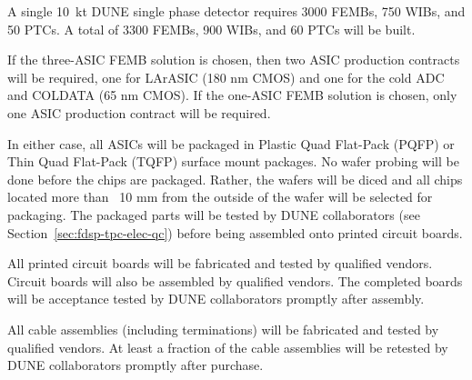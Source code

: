 A single 10~kt DUNE single phase detector requires 3000 FEMBs, 750 WIBs, and 50 PTCs.  A total of 3300 FEMBs, 900 WIBs, and 60 PTCs will be built.

If the three-ASIC FEMB solution is chosen, then two ASIC production contracts will be required, one for LArASIC (180 nm CMOS) and one for the cold ADC and COLDATA (65 nm CMOS).  If the one-ASIC FEMB solution is chosen, only one ASIC production contract will be required.

In either case, all ASICs will be packaged in Plastic Quad Flat-Pack (PQFP) or Thin Quad Flat-Pack (TQFP) surface mount packages.  No wafer probing will be done before the chips are packaged.  Rather, the wafers will be diced and all chips located more than ~10 mm from the outside of the wafer will be selected for packaging.  The packaged parts will be tested by DUNE collaborators (see Section~\ref{sec:fdsp-tpc-elec-qc}) before being assembled onto printed circuit boards.

All printed circuit boards will be fabricated and tested by qualified vendors. Circuit boards will also be assembled by qualified vendors.  The completed boards will be acceptance tested by DUNE collaborators promptly after assembly.

All cable assemblies (including terminations) will be fabricated and tested by qualified vendors. At least a fraction of the cable assemblies will be retested by DUNE collaborators promptly after purchase.

